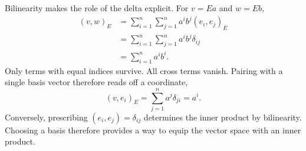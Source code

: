 Bilinearity makes the role of the delta explicit. For \(v=Ea\) and
\(w=Eb\),
\[
  \begin{aligned}
    (v,w)_E
      &=\sum_{i=1}^n\sum_{j=1}^n a^ib^j(e_i,e_j)_E\\
      &=\sum_{i=1}^n\sum_{j=1}^n a^ib^j\delta_{ij}\\
      &=\sum_{i=1}^n a^ib^i.
  \end{aligned}
\]
Only terms with equal indices survive. All cross terms vanish.
Pairing with a single basis vector therefore reads off a coordinate,
\[
  (v,e_i)_E=\sum_{j=1}^n a^j\delta_{ji}=a^i.
\]
Conversely, prescribing \((e_i,e_j)=\delta_{ij}\) determines the inner
product by bilinearity. Choosing a basis therefore provides a way to
equip the vector space with an inner product.
